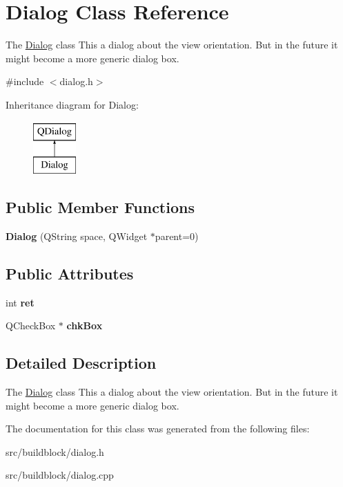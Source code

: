 \hypertarget{classDialog}{}\section{Dialog Class Reference}
\label{classDialog}


The \mbox{\hyperlink{classDialog}{Dialog}} class This a dialog about the view orientation. But in the future it might become a more generic dialog box.  




{\ttfamily \#include $<$dialog.\+h$>$}

Inheritance diagram for Dialog\+:\begin{figure}[H]
\begin{center}
\leavevmode
\includegraphics[height=2.000000cm]{classDialog}
\end{center}
\end{figure}
\subsection*{Public Member Functions}
\begin{DoxyCompactItemize}
\item 
\mbox{\label{classDialog_a20eb290a76ed7ab7a96822527a061cbf}} 
{\bfseries Dialog} (Q\+String space, Q\+Widget $\ast$parent=0)
\end{DoxyCompactItemize}
\subsection*{Public Attributes}
\begin{DoxyCompactItemize}
\item 
\mbox{\label{classDialog_a1a1877cbe1d70bf773883ee26f3f3f77}} 
int {\bfseries ret}
\item 
\mbox{\label{classDialog_a23bf556d60e1249dae5dff6c7696ed18}} 
Q\+Check\+Box $\ast$ {\bfseries chk\+Box}
\end{DoxyCompactItemize}


\subsection{Detailed Description}
The \mbox{\hyperlink{classDialog}{Dialog}} class This a dialog about the view orientation. But in the future it might become a more generic dialog box. 

The documentation for this class was generated from the following files\+:\begin{DoxyCompactItemize}
\item 
src/buildblock/dialog.\+h\item 
src/buildblock/dialog.\+cpp\end{DoxyCompactItemize}
